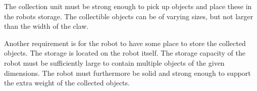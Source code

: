 The collection unit must be strong enough to pick up objects and place these in the robots storage. The collectible objects can be of varying sizes, but not larger than the width of the claw.

Another requirement is for the robot to have some place to store the collected objects. The storage is located on the robot itself. The storage capacity of the robot must be sufficiently large to contain multiple objects of the given dimensions. The robot must furthermore be solid and strong enough to support the extra weight of the collected objects. 





